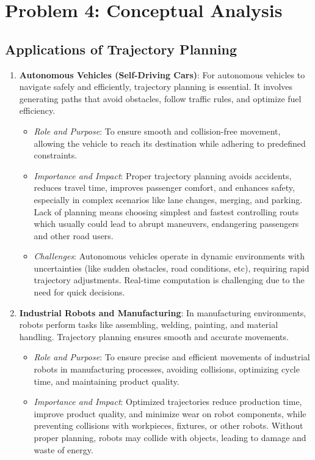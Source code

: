 \documentclass[conference]{IEEEtran}
\begin{document}
\vspace{20px}
\section{Problem 4: Conceptual Analysis}
\subsection{Applications of Trajectory Planning}
\begin{enumerate}
    \item \textbf{Autonomous Vehicles (Self-Driving Cars)}: For autonomous vehicles to navigate safely and efficiently, trajectory planning is essential. It involves generating paths that avoid obstacles, follow traffic rules, and optimize fuel efficiency.
          \begin{itemize}
              \item \textit{Role and Purpose}: To ensure smooth and collision-free movement, allowing the vehicle to reach its destination while adhering to predefined constraints.
              \item \textit{Importance and Impact}: Proper trajectory planning avoids accidents, reduces travel time, improves passenger comfort, and enhances safety, especially in complex scenarios like lane changes, merging, and parking. Lack of planning means choosing simplest and fastest controlling routs which usually could lead to abrupt maneuvers, endangering passengers and other road users.
              \item \textit{Challenges}: Autonomous vehicles operate in dynamic environments with uncertainties (like sudden obstacles, road conditions, etc), requiring rapid trajectory adjustments. Real-time computation is challenging due to the need for quick decisions.
          \end{itemize}
    \item \textbf{Industrial Robots and Manufacturing}: In manufacturing environments, robots perform tasks like assembling, welding, painting, and material handling. Trajectory planning ensures smooth and accurate movements.
          \begin{itemize}
              \item \textit{Role and Purpose}: To ensure precise and efficient movements of industrial robots in manufacturing processes, avoiding collisions, optimizing cycle time, and maintaining product quality.
              \item \textit{Importance and Impact}: Optimized trajectories reduce production time, improve product quality, and minimize wear on robot components, while preventing collisions with workpieces, fixtures, or other robots. Without proper planning, robots may collide with objects, leading to damage and waste of energy.

\end{itemize}
\end{enumerate}
\end{document}
